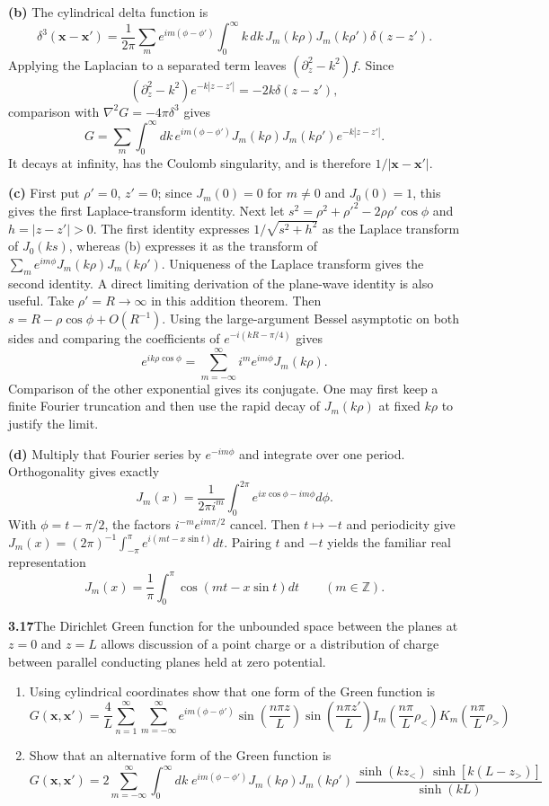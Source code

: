 \textbf{(b)} The cylindrical delta function is
\[
\delta^3(\mathbf x-\mathbf x')=
\frac1{2\pi}\sum_m e^{im(\phi-\phi')}
\int_0^\infty k\,dk\,J_m(k\rho)J_m(k\rho')\delta(z-z').
\]
Applying the Laplacian to a separated term leaves
$(\partial_z^2-k^2)f$.  Since
\[
(\partial_z^2-k^2)e^{-k|z-z'|}=-2k\delta(z-z'),
\]
comparison with $\nabla^2G=-4\pi\delta^3$ gives
\[
G=\sum_m\int_0^\infty dk\,e^{im(\phi-\phi')}
J_m(k\rho)J_m(k\rho')e^{-k|z-z'|}.
\]
It decays at infinity, has the Coulomb singularity, and is therefore
$1/|\mathbf x-\mathbf x'|$.

\textbf{(c)} First put $\rho'=0$, $z'=0$; since $J_m(0)=0$ for
$m\ne0$ and $J_0(0)=1$, this gives the first Laplace-transform
identity.  Next let
$s^2=\rho^2+\rho'^2-2\rho\rho'\cos\phi$ and $h=|z-z'|>0$.
The first identity expresses $1/\sqrt{s^2+h^2}$ as the Laplace
transform of $J_0(ks)$, whereas (b) expresses it as the transform
of $\sum_me^{im\phi}J_m(k\rho)J_m(k\rho')$.
Uniqueness of the Laplace transform gives the second identity.
A direct limiting derivation of the plane-wave identity is also
useful.  Take $\rho'=R\to\infty$ in this addition theorem.
Then $s=R-\rho\cos\phi+O(R^{-1})$.  Using the large-argument
Bessel asymptotic on both sides and comparing the coefficients of
$e^{-i(kR-\pi/4)}$ gives
\[
e^{ik\rho\cos\phi}=\sum_{m=-\infty}^\infty
 i^me^{im\phi}J_m(k\rho).
\]
Comparison of the other exponential gives its conjugate.  One may
first keep a finite Fourier truncation and then use the rapid decay
of $J_m(k\rho)$ at fixed $k\rho$ to justify the limit.

\textbf{(d)} Multiply that Fourier series by $e^{-im\phi}$ and
integrate over one period.  Orthogonality gives exactly
\[
J_m(x)=\frac1{2\pi i^m}\int_0^{2\pi}e^{ix\cos\phi-im\phi}d\phi.
\]
With $\phi=t-\pi/2$, the factors $i^{-m}e^{im\pi/2}$ cancel.
Then $t\mapsto-t$ and periodicity give
$J_m(x)=(2\pi)^{-1}\int_{-\pi}^{\pi}e^{i(mt-x\sin t)}dt$.
Pairing $t$ and $-t$ yields the familiar real representation
\[
J_m(x)=\frac1\pi\int_0^\pi\cos(mt-x\sin t)dt
\qquad(m\in\mathbb Z).
\]

\par\bigskip
\noindent\textbf{3.17}\quad The Dirichlet Green function for the unbounded space between the planes at $z=0$ and $z=L$ allows discussion of a point charge or a distribution of charge between parallel conducting planes held at zero potential.
\begin{enumerate}
\item[(a)] Using cylindrical coordinates show that one form of the Green function is
\[
G(\mathbf{x},\mathbf{x}')=\frac{4}{L}\sum_{n=1}^{\infty}\sum_{m=-\infty}^{\infty}e^{im(\phi-\phi')}\sin\!\left(\frac{n\pi z}{L}\right)\sin\!\left(\frac{n\pi z'}{L}\right)I_{m}\!\left(\frac{n\pi}{L}\rho_{<}\right)\!K_{m}\!\left(\frac{n\pi}{L}\rho_{>}\right)
\]
\item[(b)] Show that an alternative form of the Green function is
\[
G(\mathbf{x},\mathbf{x}')=2\sum_{m=-\infty}^{\infty}\int_{0}^{\infty}dk\;e^{im(\phi-\phi')}J_{m}(k\rho)J_{m}(k\rho')\,\frac{\sinh(kz_{<})\,\sinh[k(L-z_{>})]}{\sinh(kL)}
\]
\end{enumerate}
\solution


